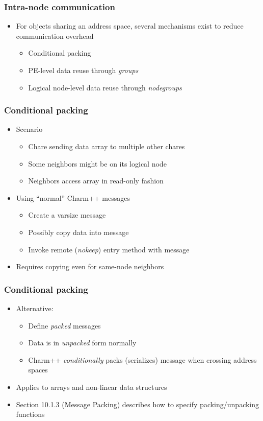 \begin{frame}[fragile]
  \frametitle{Intra-node communication}
  \begin{itemize}
    \item For objects sharing an address space, several mechanisms exist to reduce communication overhead
    \begin{itemize}
      \item Conditional packing
      \item PE-level data reuse through {\em groups}
      \item Logical node-level data reuse through {\em nodegroups}
    \end{itemize}
  \end{itemize}
\end{frame}

\begin{frame}[fragile]
  \frametitle{Conditional packing}
  \begin{itemize}
  \item Scenario
    \begin{itemize}
      \item Chare sending data array to multiple other chares
      \item Some neighbors might be on its logical node
      \item Neighbors access array in read-only fashion
    \end{itemize}
  \item Using ``normal'' Charm++ messages
    \begin{itemize}
      \item Create a varsize message
      \item Possibly copy data into message
      \item Invoke remote ({\em nokeep}) entry method with message
    \end{itemize}
  \item Requires copying even for same-node neighbors
  \end{itemize}
\end{frame}

\begin{frame}[fragile]
  \frametitle{Conditional packing}
  \begin{itemize}
  \item Alternative:
    \begin{itemize}
    \item Define {\em packed} messages 
    \item Data is in {\em unpacked} form normally
    \item Charm++ {\em conditionally} packs (serializes) message when crossing address spaces
    \end{itemize}
  \item Applies to arrays and non-linear data structures 
  \item Section 10.1.3 (Message Packing) describes how to specify packing/unpacking functions
  \end{itemize}
\end{frame}


